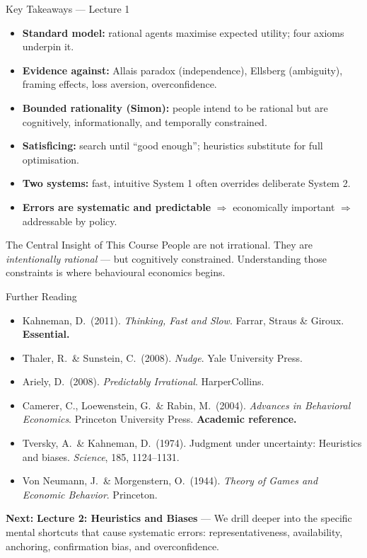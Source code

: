 \documentclass[aspectratio=169]{beamer}
\begin{document}
\begin{frame}{Key Takeaways --- Lecture 1}
\begin{itemize}
  \item[\textcolor{beteal}{\checkmark}] \textbf{Standard model:} rational agents maximise expected utility; four axioms underpin it.
  \item[\textcolor{beteal}{\checkmark}] \textbf{Evidence against:} Allais paradox (independence), Ellsberg (ambiguity), framing effects, loss aversion, overconfidence.
  \item[\textcolor{beteal}{\checkmark}] \textbf{Bounded rationality (Simon):} people intend to be rational but are cognitively, informationally, and temporally constrained.
  \item[\textcolor{beteal}{\checkmark}] \textbf{Satisficing:} search until ``good enough''; heuristics substitute for full optimisation.
  \item[\textcolor{beteal}{\checkmark}] \textbf{Two systems:} fast, intuitive System 1 often overrides deliberate System 2.
  \item[\textcolor{beteal}{\checkmark}] \textbf{Errors are systematic and predictable} $\Rightarrow$ economically important $\Rightarrow$ addressable by policy.
\end{itemize}
\medskip
\begin{alertblock}{The Central Insight of This Course}
People are not irrational. They are \textit{intentionally rational} --- but cognitively constrained. Understanding those constraints is where behavioural economics begins.
\end{alertblock}
\end{frame}

\begin{frame}{Further Reading}
\begin{itemize}
  \item Kahneman, D.\ (2011). \textit{Thinking, Fast and Slow}. Farrar, Straus \& Giroux. \textcolor{bepurple}{\textbf{Essential.}}
  \item Thaler, R.\ \& Sunstein, C.\ (2008). \textit{Nudge}. Yale University Press.
  \item Ariely, D.\ (2008). \textit{Predictably Irrational}. HarperCollins.
  \item Camerer, C., Loewenstein, G.\ \& Rabin, M.\ (2004). \textit{Advances in Behavioral Economics}. Princeton University Press. \textcolor{bepurple}{\textbf{Academic reference.}}
  \item Tversky, A.\ \& Kahneman, D.\ (1974). Judgment under uncertainty: Heuristics and biases. \textit{Science}, 185, 1124--1131.
  \item Von Neumann, J.\ \& Morgenstern, O.\ (1944). \textit{Theory of Games and Economic Behavior}. Princeton.
\end{itemize}
\medskip\textcolor{beblue}{\textbf{Next:}} \textbf{Lecture 2: Heuristics and Biases} --- We drill deeper into the specific mental shortcuts that cause systematic errors: representativeness, availability, anchoring, confirmation bias, and overconfidence.
\end{frame}
\end{document}
